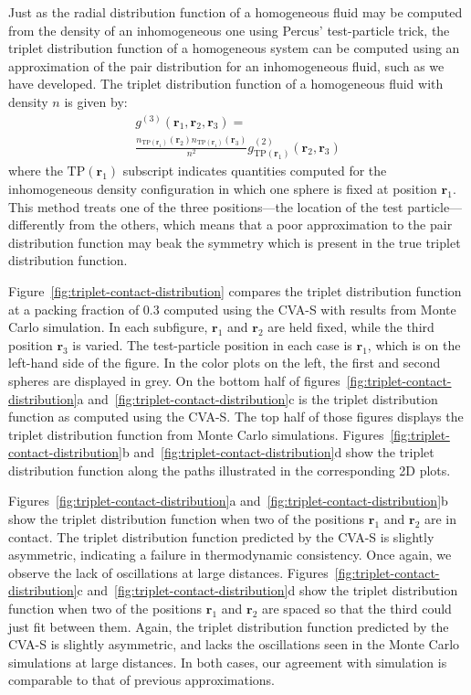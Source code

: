 \documentclass[letterpaper,twocolumn,amsmath,amssymb,pre,aps,10pt]{revtex4-1}
\newcommand{\rr}{\textbf{r}}
\begin{document}
Just as the radial distribution function of a homogeneous fluid may be
computed from the density of an inhomogeneous one using Percus'
test-particle trick, the triplet distribution function of a
homogeneous system can be computed using an approximation of the pair
distribution for an inhomogeneous fluid, such as we have
developed. The triplet distribution function of a homogeneous fluid
with density $n$ is given by:
\begin{multline}
    g^{(3)}(\rr_1,\rr_2,\rr_3) =\\
    \frac{n_{\textrm{TP}(\rr_1)}(\rr_2)
      n_{\textrm{TP}(\rr_1)}(\rr_3)}{n^2}
    g^{(2)}_{\textrm{TP}(\rr_1)}(\rr_2,\rr_3)
\end{multline}
where the $\textrm{TP}(\rr_1)$ subscript indicates quantities computed for
the inhomogeneous density configuration in which one sphere is fixed
at position $\rr_1$.  This method treats one of the three
positions---the location of the test particle---differently from the
others, which means that a poor approximation to the pair distribution
function may beak the symmetry which is present in the true triplet
distribution function.

Figure~\ref{fig:triplet-contact-distribution} compares the triplet
distribution function at a packing fraction of 0.3 computed using the
CVA-S with results from Monte Carlo simulation.  In each subfigure,
$\rr_1$ and $\rr_2$ are held fixed, while the third position $\rr_3$
is varied.  The test-particle position in each case is $\rr_1$, which
is on the left-hand side of the figure.  In the color plots on the
left, the first and second spheres are displayed in grey.  On the
bottom half of figures~\ref{fig:triplet-contact-distribution}a
and~\ref{fig:triplet-contact-distribution}c is the triplet
distribution function as computed using the CVA-S.  The top half of
those figures displays the triplet distribution function from Monte
Carlo simulations.  Figures~\ref{fig:triplet-contact-distribution}b
and~\ref{fig:triplet-contact-distribution}d show the triplet
distribution function along the paths illustrated in the corresponding
2D plots.

Figures~\ref{fig:triplet-contact-distribution}a
and~\ref{fig:triplet-contact-distribution}b show the triplet
distribution function when two of the positions $\rr_1$ and $\rr_2$
are in contact.  The triplet distribution function predicted by the
CVA-S is slightly asymmetric, indicating a failure in thermodynamic
consistency.  Once again, we observe the lack of oscillations at large
distances.  Figures~\ref{fig:triplet-contact-distribution}c
and~\ref{fig:triplet-contact-distribution}d show the triplet
distribution function when two of the positions $\rr_1$ and $\rr_2$
are spaced so that the third could just fit between them.  Again, the
triplet distribution function predicted by the CVA-S is slightly
asymmetric, and lacks the oscillations seen in the Monte Carlo
simulations at large distances.  In both cases, our agreement with
simulation is comparable to that of previous approximations.
\end{document}
